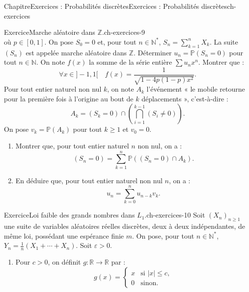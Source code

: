 \documentclass[twoside,10pt,]{book}
\numberwithin{equation}{chapter}
\newcommand{\N}{\mathbb N}
\newcommand{\R}{\mathbb R}
\renewcommand{\Pr}{\mathbb P}
\newcommand{\gt}{>}
\newcommand{\amp}{&}
\begin{document}
\begin{chapterptx}{Chapitre}{Exercices : Probabilités discrètes}{}{Exercices : Probabilités discrètes}{}{}{ch-exercices}
\begin{inlineexercise}{Exercice}{Marche aléatoire dans \(\mathbb{Z}\).}{ch-exercices-9}
\begin{equation*}
\end{equation*}
où \(p \in [0, 1]\). On pose \(S_{0} = 0\) et, pour tout \(n \in \N^{*}\), \(S_{n} = \sum_{k=1}^{n} X_{k}\). La suite \((S_{n})\) est appelée marche aléatoire dans \(\mathbb{Z}\).%
Déterminer \(u_{n} = \Pr(S_{n} = 0)\) pour tout \(n \in \N\).%
On note \(f(x)\) la somme de la série entière \(\sum u_{n} x^{n}\). Montrer que :%
\begin{equation*}
\forall x \in ]-1, 1[ \quad f(x) = \frac{1}{\sqrt{1 - 4 p (1 - p) x^{2}}}.
\end{equation*}
%
Pour tout entier naturel non nul \(k\), on note \(A_{k}\) l'événement « le mobile retourne pour la première fois à l'origine au bout de \(k\) déplacements », c'est-à-dire :%
\begin{equation*}
A_{k} = (S_{k} = 0) \cap \left(\bigcap_{i=1}^{k-1} (S_{i} \neq 0)\right).
\end{equation*}
On pose \(v_{k} = \Pr(A_{k})\) pour tout \(k \geqslant 1\) et \(v_{0} = 0\).%
%
\begin{enumerate}[label={\arabic*.}]
\item{}Montrer que, pour tout entier naturel \(n\) non nul, on a :%
\begin{equation*}
(S_{n} = 0) = \sum_{k=1}^{n} \Pr((S_{n} = 0) \cap A_{k}).
\end{equation*}
%
\item{}En déduire que, pour tout entier naturel non nul \(n\), on a :%
\begin{equation*}
u_{n} = \sum_{k=0}^{n} u_{n - k} v_{k}.
\end{equation*}
%
\end{enumerate}
\end{inlineexercise}%
\begin{inlineexercise}{Exercice}{Loi faible des grands nombres dans \(L_{1}\).}{ch-exercices-10}%
Soit \((X_{n})_{n \geqslant 1}\) une suite de variables aléatoires réelles discrètes, deux à deux indépendantes, de même loi, possédant une espérance finie \(m\). On pose, pour tout \(n \in \N^{*}\), \(Y_{n} = \frac{1}{n} (X_{1} + \cdots + X_{n})\).%
Soit \(\varepsilon \gt 0\).%
%
\begin{enumerate}[label={\arabic*.}]
\item{}Pour \(c\gt0\), on définit \(g: \R \rightarrow \R\) par :%
\begin{equation*}
g(x) = \begin{cases}
x \amp \text{si } |x| \leqslant c, \\
0 \amp \text{sinon.}
\end{cases}

\end{equation*}
\end{enumerate}
\end{inlineexercise}
\end{chapterptx}
\end{document}
